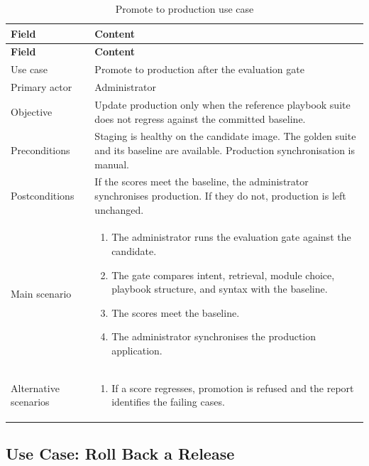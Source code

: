 \begingroup
\footnotesize
\renewcommand{\arraystretch}{1.15}
\begin{longtable}{|L{3.2cm}|L{11.6cm}|}
\caption{Promote to production use case}
\label{tab:use-case-promote-production} \\
\hline
{}
\textbf{Field} & \textbf{Content} \\
\hline
\endfirsthead
\hline
{}
\textbf{Field} & \textbf{Content} \\
\hline
\endhead
Use case & Promote to production after the evaluation gate \\
\hline
Primary actor & Administrator \\
\hline
Objective & Update production only when the reference playbook suite does not regress against the committed baseline. \\
\hline
Preconditions & Staging is healthy on the candidate image. The golden suite and its baseline are available. Production synchronisation is manual. \\
\hline
Postconditions & If the scores meet the baseline, the administrator synchronises production. If they do not, production is left unchanged. \\
\hline
Main scenario & \begin{enumerate}[leftmargin=1.5em,itemsep=0.1em,topsep=0.2em]
  \item The administrator runs the evaluation gate against the candidate.
  \item The gate compares intent, retrieval, module choice, playbook structure, and syntax with the baseline.
  \item The scores meet the baseline.
  \item The administrator synchronises the production application.
\end{enumerate} \\
\hline
Alternative scenarios & \begin{enumerate}[label=A\arabic*.,leftmargin=2em,itemsep=0.1em,topsep=0.2em]
  \item If a score regresses, promotion is refused and the report identifies the failing cases.
\end{enumerate} \\
\hline
\end{longtable}
\endgroup

\subsection{Use Case: Roll Back a Release}

